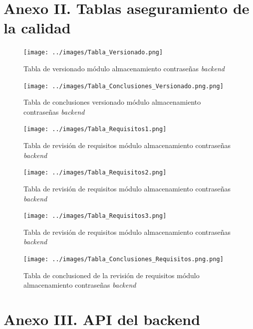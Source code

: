 \documentclass{article}
\begin{document}
\section*{Anexo II. Tablas aseguramiento de la calidad}
\begin{figure}[H]
   \texttt{[image: ../images/Tabla\_Versionado.png]}
   \caption{Tabla de versionado módulo almacenamiento contraseñas \textit{backend}}
\end{figure}
\begin{figure}[H]
   \texttt{[image: ../images/Tabla\_Conclusiones\_Versionado.png.png]}
   \caption{Tabla de conclusiones versionado módulo almacenamiento contraseñas \textit{backend}}
\end{figure}
\begin{figure}[H]
   \texttt{[image: ../images/Tabla\_Requisitos1.png]}
   \caption{Tabla de revisión de requisitos módulo almacenamiento contraseñas \textit{backend}}
\end{figure}
\begin{figure}[H]
   \texttt{[image: ../images/Tabla\_Requisitos2.png]}
   \caption{Tabla de revisión de requisitos módulo almacenamiento contraseñas \textit{backend}}
\end{figure}
\begin{figure}[H]
   \texttt{[image: ../images/Tabla\_Requisitos3.png]}
   \caption{Tabla de revisión de requisitos módulo almacenamiento contraseñas \textit{backend}}
\end{figure}
\begin{figure}[H]
   \texttt{[image: ../images/Tabla\_Conclusiones\_Requisitos.png.png]}
   \caption{Tabla de conclusioned de la revisión de requisitos módulo almacenamiento contraseñas \textit{backend}}
\end{figure}

\section*{Anexo III. API del backend}
\end{document}
